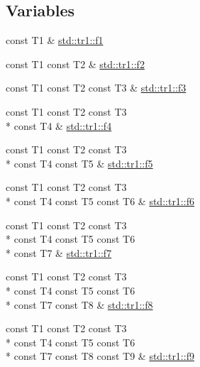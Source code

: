 \subsection*{Variables}
\begin{DoxyCompactItemize}
\item 
const T1 \& \hyperlink{namespacestd_1_1tr1_a9c0fa65b105f8e2f58ba59ecf75fd000}{std\+::tr1\+::f1}
\item 
const T1 const T2 \& \hyperlink{namespacestd_1_1tr1_a87dd9e009868361317f587126dba63d4}{std\+::tr1\+::f2}
\item 
const T1 const T2 const T3 \& \hyperlink{namespacestd_1_1tr1_a0f7c3b47d27d42d82d1a333ea420ce4e}{std\+::tr1\+::f3}
\item 
const T1 const T2 const T3 \\*
const T4 \& \hyperlink{namespacestd_1_1tr1_adc796e02b7385d526aff708189564f67}{std\+::tr1\+::f4}
\item 
const T1 const T2 const T3 \\*
const T4 const T5 \& \hyperlink{namespacestd_1_1tr1_a9c1eb66b2b2fa321942af95405232a0d}{std\+::tr1\+::f5}
\item 
const T1 const T2 const T3 \\*
const T4 const T5 const T6 \& \hyperlink{namespacestd_1_1tr1_a6b62f32e1e3e21bceb94eb46c4cbfd56}{std\+::tr1\+::f6}
\item 
const T1 const T2 const T3 \\*
const T4 const T5 const T6 \\*
const T7 \& \hyperlink{namespacestd_1_1tr1_a2185f3a1c07f2df072c39cb91ffa89a4}{std\+::tr1\+::f7}
\item 
const T1 const T2 const T3 \\*
const T4 const T5 const T6 \\*
const T7 const T8 \& \hyperlink{namespacestd_1_1tr1_ab998afa41cea8d6d26d7e4288b0bf974}{std\+::tr1\+::f8}
\item 
const T1 const T2 const T3 \\*
const T4 const T5 const T6 \\*
const T7 const T8 const T9 \& \hyperlink{namespacestd_1_1tr1_a216d2c7cdfaaf415caba2f88e2c34413}{std\+::tr1\+::f9}
\end{DoxyCompactItemize}


